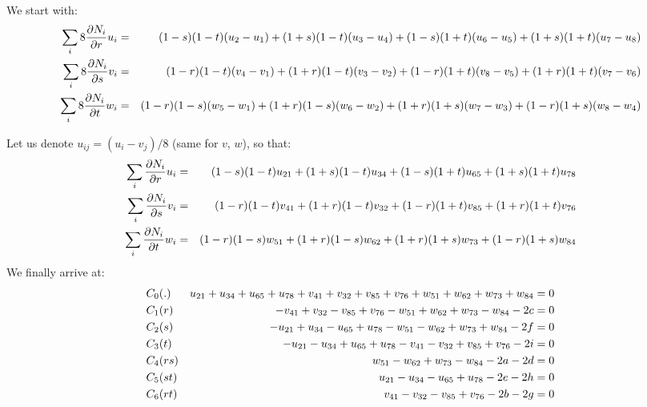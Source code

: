 We start with:
\begin{eqnarray}
\sum_i 8\frac{\partial N_i}{\partial r} u_i 
&=& (1-s)(1-t)(u_2-u_1)
+ (1+s)(1-t)(u_3-u_4)
+ (1-s)(1+t)(u_6-u_5)
+ (1+s)(1+t)(u_7-u_8) \nonumber\\
\sum_i 8\frac{\partial N_i}{\partial s} v_i 
&=& (1-r)(1-t)(v_4-v_1)
+ (1+r)(1-t)(v_3-v_2)
+ (1-r)(1+t)(v_8-v_5)
+ (1+r)(1+t)(v_7-v_6) \nonumber\\
\sum_i 8\frac{\partial N_i}{\partial t} w_i 
&=& (1-r)(1-s)(w_5-w_1)
+ (1+r)(1-s)(w_6-w_2)
+ (1+r)(1+s)(w_7-w_3)
+ (1-r)(1+s)(w_8-w_4) \nonumber
\end{eqnarray}

Let us denote $u_{ij}=(u_i-v_j)/8$ (same for $v$, $w$), so that:
\begin{eqnarray}
\sum_i \frac{\partial N_i}{\partial r} u_i 
&=& (1-s)(1-t)u_{21}
+ (1+s)(1-t)u_{34}
+ (1-s)(1+t)u_{65}
+ (1+s)(1+t)u_{78} \nonumber\\
\sum_i \frac{\partial N_i}{\partial s} v_i 
&=& (1-r)(1-t)v_{41}
+ (1+r)(1-t)v_{32}
+ (1-r)(1+t)v_{85}
+ (1+r)(1+t)v_{76} \nonumber\\
\sum_i \frac{\partial N_i}{\partial t} w_i 
&=& 
  (1-r)(1-s)w_{51}
+ (1+r)(1-s)w_{62}
+ (1+r)(1+s)w_{73}
+ (1-r)(1+s)w_{84} \nonumber
\end{eqnarray}
We finally arrive at:
\begin{eqnarray}
C_0   &(.)  &  u_{21} + u_{34} + u_{65} + u_{78} + v_{41} + v_{32} + v_{85} + v_{76} + w_{51} + w_{62} + w_{73} + w_{84} =0  \nonumber\\
C_1   &(r)  &  -v_{41} +v_{32} -v_{85} + v_{76} - w_{51} + w_{62} + w_{73} -w_{84} -2c =0\nonumber\\ 
C_2   &(s)  &  -u_{21} +u_{34} -u_{65} + u_{78} - w_{51} - w_{62} + w_{73} +w_{84} -2f =0 \nonumber\\ 
C_3   &(t)  &  -u_{21} -u_{34} +u_{65} + u_{78} - v_{41} - v_{32} + v_{85} +v_{76} -2i =0 \nonumber\\ 
C_4   &(rs) &  w_{51} -w_{62} +w_{73} - w_{84}  -2a -2d =0  \nonumber\\
C_5   &(st) &  u_{21} -u_{34} -u_{65} + u_{78}  -2e -2h =0  \nonumber\\
C_6   &(rt) &  v_{41} -v_{32} -v_{85} + v_{76}  -2b -2g =0  \nonumber
\end{eqnarray}

